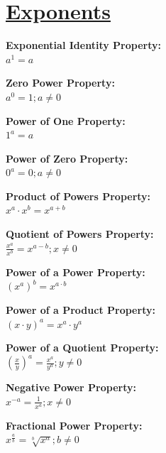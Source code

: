 \documentclass[12pt]{article}
\begin{document}
\section*{\underline{\textbf{Exponents}}}
\begin{minipage}{\textwidth}
    \textbf{Exponential Identity Property:}
    \\ \( a^1 = a \)
\end{minipage}
\begin{minipage}{\textwidth}
    \textbf{Zero Power Property:}
    \\ \( a^0 = 1 ; a \ne 0 \)
\end{minipage}
\begin{minipage}{\textwidth}
    \textbf{Power of One Property:}
    \\ \( 1^a = a \)
\end{minipage}
\begin{minipage}{\textwidth}
    \textbf{Power of Zero Property:}
    \\ \( 0^a = 0 ; a \ne 0 \)
\end{minipage}
\begin{minipage}{\textwidth}
    \textbf{Product of Powers Property:}
    \\ \( x^a \cdot x^b = x^{a + b} \)
\end{minipage}
\begin{minipage}{\textwidth}
    \textbf{Quotient of Powers Property:}
    \\ \( \displaystyle\frac{ x^a }{ x^b } = x^{a - b} ; x \ne 0 \)
\end{minipage}
\begin{minipage}{\textwidth}
    \textbf{Power of a Power Property:}
    \\ \( (x^a)^b = x^{a \cdot b} \)
\end{minipage}
\begin{minipage}{\textwidth}
    \textbf{Power of a Product Property:}
    \\ \( (x \cdot y)^a = x^a \cdot y^a \)
\end{minipage}
\begin{minipage}{\textwidth}
    \textbf{Power of a Quotient Property:}
    \\ \( \left( \displaystyle\frac{ x }{ y } \right)^a = \frac{ x^a }{ y^a } ; y \ne 0 \)
\end{minipage}
\begin{minipage}{\textwidth}
    \textbf{Negative Power Property:}
    \\ \( x^{-a} = \frac{ 1 }{ x^a } ; x \ne 0 \)
\end{minipage}
\begin{minipage}{\textwidth}
    \textbf{Fractional Power Property:}
    \\ \( x^{\frac{ a }{ b }} = \displaystyle\sqrt[b]{x^a} ; b \ne 0 \)
\end{minipage}
\end{document}
